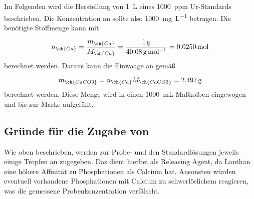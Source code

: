     Im Folgenden wird die Herstellung von \SI[mode=text]{1}{\liter} eines \SI[mode=text]{1000}{ppm}  Ur-Standards beschrieben. Die Konzentration an  sollte also \SI[mode=text]{1000}{\milli\gram\per\liter} betragen. Die benötigte Stoffmenge kann mit 
        
      \begin{equation}
        n_{\ch{Ca}} = \frac{m_{\ch{Ca}}}{M_{\ch{Ca}}} = \frac{\SI[mode=text]{1}{\gram}}{\SI[mode=text]{40.08}{\gram\per\mole}} = \SI[mode=text]{0.0250}{\mole}
      \end{equation}   
    berechnet werden. Daraus kann die Einwaage an  gemäß 
        
      \begin{equation}
        m_{\ch{CaCO3}} = n_{\ch{Ca}} M_{\ch{CaCO3}} = \SI[mode=text]{2.497}{\gram}
      \end{equation}
    berechnet werden. Diese Menge wird in einen \SI[mode=text]{1000}{\milli\liter} Maßkolben eingewogen und bis zur Marke aufgefüllt. 
      
  \subsection{Gründe für die Zugabe von }
    
    Wie oben beschrieben, werden zur Probe- und den Standardlösungen jeweils einige Tropfen an  zugegeben. Das  dient hierbei als Releasing Agent, da Lanthan eine höhere Affinität zu Phosphationen als Calcium hat. Ansonsten würden eventuell vorhandene Phosphationen mit Calcium zu schwerlöslichem  reagieren, was die gemessene Probenkonzentration verfälscht. 
    
    